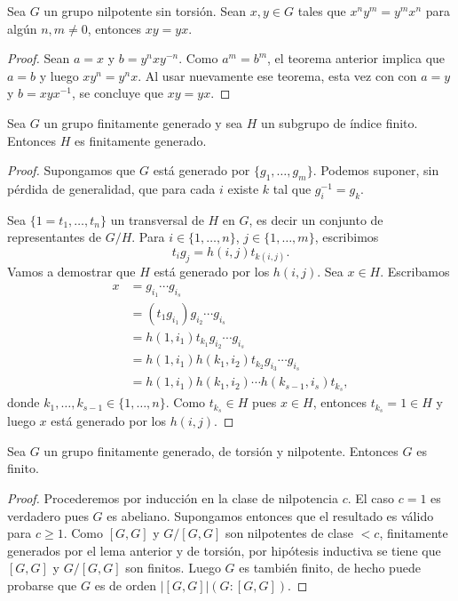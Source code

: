 \begin{corollary}
	Sea $G$ un grupo nilpotente sin torsión. Sean $x,y\in G$ tales que
	$x^ny^m=y^mx^n$ para algún $n,m\ne 0$, entonces $xy=yx$.
\end{corollary}

\begin{proof}
	Sean $a=x$ y $b=y^nxy^{-n}$. Como $a^m=b^m$, el teorema anterior
	implica que $a=b$ y luego $xy^n=y^nx$. Al usar nuevamente ese 
	teorema, esta vez con con $a=y$ y $b=xyx^{-1}$, se
	concluye que $xy=yx$. 
\end{proof}

\begin{lemma}
	\label{lemma:fg}
	Sea $G$ un grupo finitamente generado y sea $H$ un subgrupo de índice
	finito. Entonces $H$ es finitamente generado.
\end{lemma}

\begin{proof}
	Supongamos que $G$ está generado por $\{g_1,\dots,g_m\}$. Podemos suponer, sin pérdida de generalidad, que
	para cada $i$ existe $k$ tal que $g_i^{-1}=g_k$. 
	
	Sea $\{1=t_1,\dots,t_n\}$ un transversal de $H$ en $G$, es decir un 
	conjunto de representantes de $G/H$. Para $i\in\{1,\dots,n\}$,
	$j\in\{1,\dots,m\}$, escribimos
	\[
		t_ig_j=h(i,j)t_{k(i,j)}.
	\]
	Vamos a demostrar que $H$ está generado por los $h(i,j)$. Sea $x\in H$.
	Escribamos 
	\begin{align*}
	x &=g_{i_1}\cdots g_{i_s}\\
	&= (t_1g_{i_1})g_{i_2}\cdots g_{i_s}\\
	&= h(1,i_1)t_{k_1}g_{i_2}\cdots g_{i_s}\\
	&= h(1,i_1)h(k_1,i_2)t_{k_2}g_{i_3}\cdots g_{i_s}\\
	&= h(1,i_1)h(k_1,i_2)\cdots h(k_{s-1},i_s)t_{k_s},
	\end{align*}
	donde $k_1,\dots,k_{s-1}\in\{1,\dots,n\}$. Como $t_{k_s}\in H$ pues $x\in H$, entonces
	$t_{k_s}=1\in H$ y luego $x$ está generado por los $h(i,j)$.
\end{proof}

\begin{theorem}
	\label{theorem:T(G)finito}
	Sea $G$ un grupo finitamente generado, de torsión y nilpotente. Entonces
	$G$ es finito. 	
\end{theorem}

\begin{proof}
	Procederemos por inducción en la clase de nilpotencia $c$. El caso $c=1$ es
	verdadero pues $G$ es abeliano. Supongamos entonces que el resultado es
	válido para $c\geq1$.  Como $[G,G]$ y $G/[G,G]$ son nilpotentes de clase
	$<c$, finitamente generados por el lema anterior y de torsión, por
	hipótesis inductiva se tiene que $[G,G]$ y $G/[G,G]$ son finitos. Luego $G$
	es también finito, de hecho puede probarse que $G$ es de orden $|[G,G]|(G:[G,G])$.
\end{proof}

